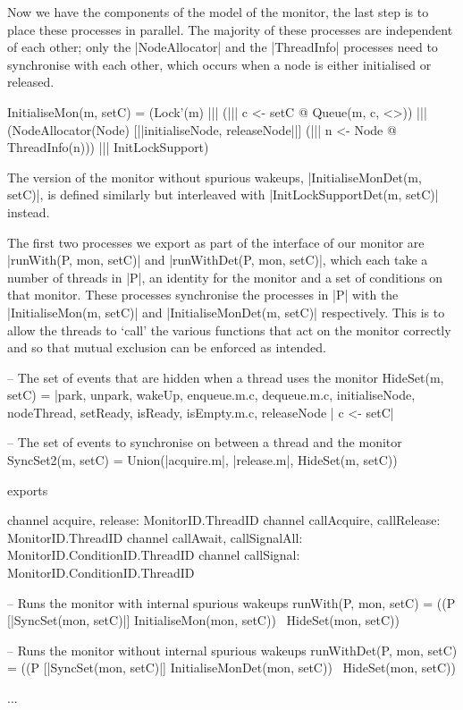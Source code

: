 Now we have the components of the model of the monitor, the last step is to place these processes in parallel. The majority of these processes are independent of each other; only the |NodeAllocator| and the |ThreadInfo| processes need to synchronise with each other, which occurs when a node is either initialised or released.
\begin{cspm}
  InitialiseMon(m, setC) = 
    (Lock'(m) ||| 
     (||| c <- setC @ Queue(m, c, <>)) |||
     (NodeAllocator(Node) [|{|initialiseNode, releaseNode|}|] 
        (||| n <- Node @ ThreadInfo(n))) ||| 
     InitLockSupport)
\end{cspm}

The version of the monitor without spurious wakeups, |InitialiseMonDet(m, setC)|, is defined similarly but interleaved with |InitLockSupportDet(m, setC)| instead. 

The first two processes we export as part of the interface of our monitor are |runWith(P, mon, setC)| and |runWithDet(P, mon, setC)|, which each take a number of threads in |P|, an identity for the monitor and a set of conditions on that monitor. These processes synchronise the processes in |P| with the |InitialiseMon(m, setC)| and |InitialiseMonDet(m, setC)| respectively. This is to allow the threads to `call' the various functions that act on the monitor correctly and so that mutual exclusion can be enforced as intended.

\begin{cspm}
  -- The set of events that are hidden when a thread uses the monitor
  HideSet(m, setC) = 
    {|park, unpark, wakeUp, enqueue.m.c, dequeue.m.c, initialiseNode, nodeThread,
      setReady, isReady, isEmpty.m.c, releaseNode | c <- setC|}

  -- The set of events to synchronise on between a thread and the monitor
    SyncSet2(m, setC) = Union({{|acquire.m|}, {|release.m|}, HideSet(m, setC)})
  
  exports

  channel acquire, release: MonitorID.ThreadID
  channel callAcquire, callRelease: MonitorID.ThreadID
  channel callAwait, callSignalAll: MonitorID.ConditionID.ThreadID
  channel callSignal: MonitorID.ConditionID.ThreadID

  -- Runs the monitor with internal spurious wakeups
  runWith(P, mon, setC) = 
    ((P [|SyncSet(mon, setC)|] 
          InitialiseMon(mon, setC)) \ HideSet(mon, setC))

  -- Runs the monitor without internal spurious wakeups
  runWithDet(P, mon, setC) = 
    ((P [|SyncSet(mon, setC)|] 
          InitialiseMonDet(mon, setC)) \  HideSet(mon, setC))

  ...
\end{cspm}

